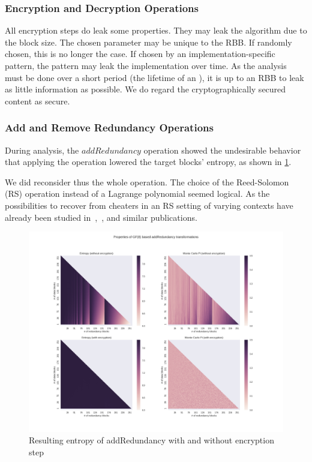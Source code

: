 \subsubsection{Encryption and Decryption Operations}
All encryption steps do leak some properties. They may leak the algorithm due to the block size. The chosen parameter may be unique to the RBB. If randomly chosen, this is no longer the case. If chosen by an implementation-specific pattern, the pattern may leak the implementation over time. As the analysis must be done over a short period (the lifetime of an ), it is up to an RBB to leak as little information as possible. We do regard the cryptographically secured content as secure. 

\subsubsection{Add and Remove Redundancy Operations}\label{sec:analysisReedSolomon}
During analysis, the $addRedundancy$ operation showed the undesirable behavior that applying the operation lowered the target blocks' entropy, as shown in \cref{fig:entropy}. 

We did reconsider thus the whole operation. The choice of the Reed-Solomon (RS) operation instead of a Lagrange polynomial seemed logical. As the possibilities to recover from cheaters in an RS setting of varying contexts have already been studied in~\cite{mceliece1981sharing},~\cite{bu2017rasss}, and similar publications.

\begin{figure}[!t]\centering
	\includegraphics[width=1\textwidth]{inc/randomblock_10kb}
	\caption{Resulting entropy of addRedundancy with and without encryption step}
	\label{fig:entropy}
\end{figure}


